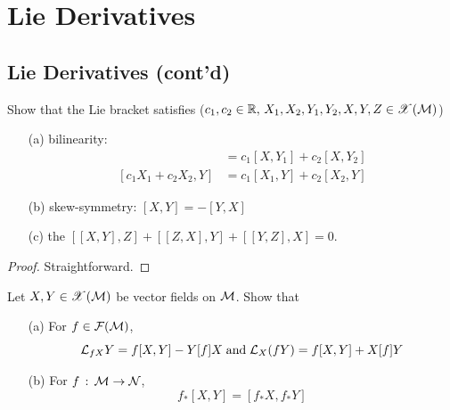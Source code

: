\documentclass[a4paper, 10pt]{article}
\begin{document}
\setcounter{section}{5}
\section{Lie Derivatives}

\setcounter{subsection}{1}
\subsection{Lie Derivatives (cont'd)}

\setcounter{theorem}{8}

\begin{exer}
    Show that the Lie bracket satisfies ($c_{1},c_{2} \in \mathbb{R},\, X_{1},X_{2},Y_{1},Y_{2},X,Y,Z \in \mathscr{X}(\mathcal{M})$)
    \begin{itemize}
        \item[(a)] bilinearity:
        \begin{align*}
            [X, c_{1}Y_{1} + c_{2}Y_{2}] &= c_{1}[X, Y_{1}] + c_{2}[X, Y_{2}] \\
            [c_{1}X_{1} + c_{2}X_{2}, Y] &= c_{1}[X_{1}, Y] + c_{2}[X_{2}, Y]
        \end{align*}
        \item[(b)] skew-symmetry: $[X, Y] = -[Y, X]$
        \item[(c)] the  $[[X, Y],Z] + [[Z, X], Y] + [[Y, Z], X] = 0$.
    \end{itemize}
\end{exer}

\begin{proof}
    Straightforward.
\end{proof}

\begin{exer}
    Let $X, Y \in \mathscr{X}(\mathcal{M})$ be vector fields on $\mathcal{M}$. Show that
    \begin{itemize}
        \item[(a)] For $f \in \mathcal{F}(\mathcal{M})$,
        \[ \mathcal{L}_{fX}Y = f[X, Y] - Y[f]X \;\text{and}\; \mathcal{L}_{X}(fY) = f[X, Y] + X[f]Y\]
        \item[(b)] For $f \,:\, \mathcal{M} \rightarrow \mathcal{N}$,
        \[ f_{\ast}[X, Y] = [f_{\ast}X, f_{\ast}Y] \]
    \end{itemize}
\end{exer}
\end{document}
